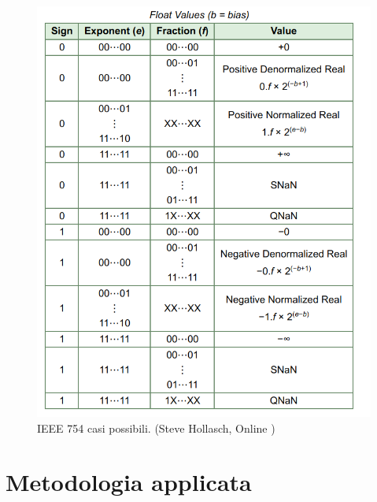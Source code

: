 \documentclass[]{IEEEtran}
\begin{document}
\begin{figure}[!htb]
    \centering
    \includegraphics[width=0.9\linewidth]{figures/codifica}
    \caption{IEEE 754 casi possibili. (Steve Hollasch, Online \cite{IEEE754Online})}
    \label{fig:IEEE_ENCODING}
\end{figure}



\section{Metodologia applicata}
\end{document}
